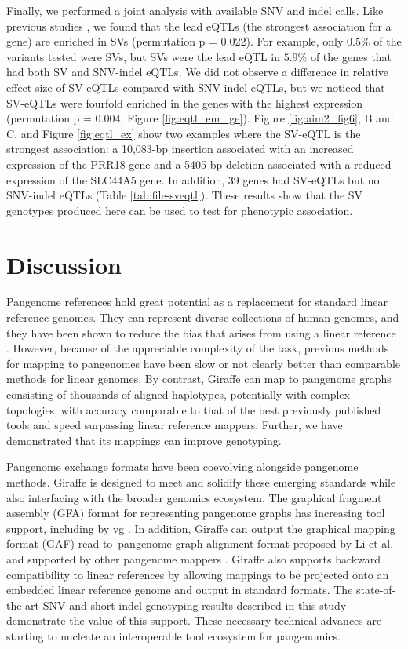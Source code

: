 \documentclass[11pt]{ucscthesis}
\begin{document}
Finally, we performed a joint analysis with available SNV and indel calls. 
Like previous studies \cite{gtex_sv_2017,Ebert2021}, we found that the lead eQTLs (the strongest association for a gene) are enriched in SVs (permutation p = 0.022).
For example, only $0.5\%$ of the variants tested were SVs, but SVs were the lead eQTL in $5.9\%$ of the genes that had both SV and SNV-indel eQTLs.
We did not observe a difference in relative effect size of SV-eQTLs compared with SNV-indel eQTLs, but we noticed that SV-eQTLs were fourfold enriched in the genes with the highest expression (permutation p = 0.004; Figure \ref{fig:eqtl_enr_ge}).
Figure \ref{fig:aim2_fig6}, B and C, and Figure \ref{fig:eqtl_ex} show two examples where the SV-eQTL is the strongest association: a 10,083-bp insertion associated with an increased expression of the PRR18 gene and a 5405-bp deletion associated with a reduced expression of the SLC44A5 gene.
In addition, 39 genes had SV-eQTLs but no SNV-indel eQTLs (Table \ref{tab:file-sveqtl}).
These results show that the SV genotypes produced here can be used to test for phenotypic association.

\section{Discussion}
Pangenome references hold great potential as a replacement for standard linear reference genomes.
They can represent diverse collections of human genomes, and they have been shown to reduce the bias that arises from using a linear reference \cite{garrison_vg_2018}.
However, because of the appreciable complexity of the task, previous methods for mapping to pangenomes have been slow or not clearly better than comparable methods for linear genomes.
By contrast, Giraffe can map to pangenome graphs consisting of thousands of aligned haplotypes, potentially with complex topologies, with accuracy comparable to that of the best previously published tools and speed surpassing linear reference mappers.
Further, we have demonstrated that its mappings can improve genotyping.

Pangenome exchange formats have been coevolving alongside pangenome methods.
Giraffe is designed to meet and solidify these emerging standards while also interfacing with the broader genomics ecosystem.
The graphical fragment assembly (GFA) format for representing pangenome graphs has increasing tool support, including by vg \cite{rautiainen_graphaligner_2020,li_minigraph_2020,koren_canu_2017,li_minimap_2016,wick_bandage_2015,spades_2020}.
In addition, Giraffe can output the graphical mapping format (GAF) read-to–pangenome graph alignment format proposed by Li et al. \cite{li_minigraph_2020} and supported by other pangenome mappers \cite{rautiainen_graphaligner_2020}.
Giraffe also supports backward compatibility to linear references by allowing mappings to be projected onto an embedded linear reference genome and output in standard formats.
The state-of-the-art SNV and short-indel genotyping results described in this study demonstrate the value of this support.
These necessary technical advances are starting to nucleate an interoperable tool ecosystem for pangenomics.
\end{document}
